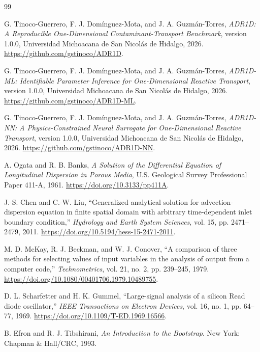 \documentclass[11pt,a4paper]{article}
\begin{document}
\clearpage
\begingroup
\footnotesize
\setlength{\parskip}{0pt}
\begin{thebibliography}{99}
\setlength{\itemsep}{2pt}
\setlength{\parsep}{0pt}

G. Tinoco-Guerrero, F. J. Domínguez-Mota, and J. A. Guzmán-Torres,
\emph{ADR1D: A Reproducible One-Dimensional Contaminant-Transport Benchmark},
version 1.0.0, Universidad Michoacana de San Nicolás de Hidalgo, 2026.
\url{https://github.com/gstinoco/ADR1D}.

G. Tinoco-Guerrero, F. J. Domínguez-Mota, and J. A. Guzmán-Torres,
\emph{ADR1D-ML: Identifiable Parameter Inference for One-Dimensional Reactive
Transport}, version 1.0.0, Universidad Michoacana de San Nicolás de Hidalgo,
2026. \url{https://github.com/gstinoco/ADR1D-ML}.

G. Tinoco-Guerrero, F. J. Domínguez-Mota, and J. A. Guzmán-Torres,
\emph{ADR1D-NN: A Physics-Constrained Neural Surrogate for One-Dimensional
Reactive Transport}, version 1.0.0, Universidad Michoacana de San Nicolás de
Hidalgo, 2026. \url{https://github.com/gstinoco/ADR1D-NN}.

A. Ogata and R. B. Banks, \emph{A Solution of the Differential Equation of
Longitudinal Dispersion in Porous Media}, U.S. Geological Survey Professional
Paper 411-A, 1961. \url{https://doi.org/10.3133/pp411A}.

J.-S. Chen and C.-W. Liu, ``Generalized analytical solution for
advection-dispersion equation in finite spatial domain with arbitrary
time-dependent inlet boundary condition,'' \emph{Hydrology and Earth System
Sciences}, vol. 15, pp. 2471--2479, 2011.
\url{https://doi.org/10.5194/hess-15-2471-2011}.

M. D. McKay, R. J. Beckman, and W. J. Conover, ``A comparison of three methods for
selecting values of input variables in the analysis of output from a computer
code,'' \emph{Technometrics}, vol. 21, no. 2, pp. 239--245, 1979.
\url{https://doi.org/10.1080/00401706.1979.10489755}.

D. L. Scharfetter and H. K. Gummel, ``Large-signal analysis of a silicon Read
diode oscillator,'' \emph{IEEE Transactions on Electron Devices}, vol. 16,
no. 1, pp. 64--77, 1969.
\url{https://doi.org/10.1109/T-ED.1969.16566}.

B. Efron and R. J. Tibshirani, \emph{An Introduction to the Bootstrap}.
New York: Chapman \& Hall/CRC, 1993.

\end{thebibliography}
\endgroup
\end{document}
